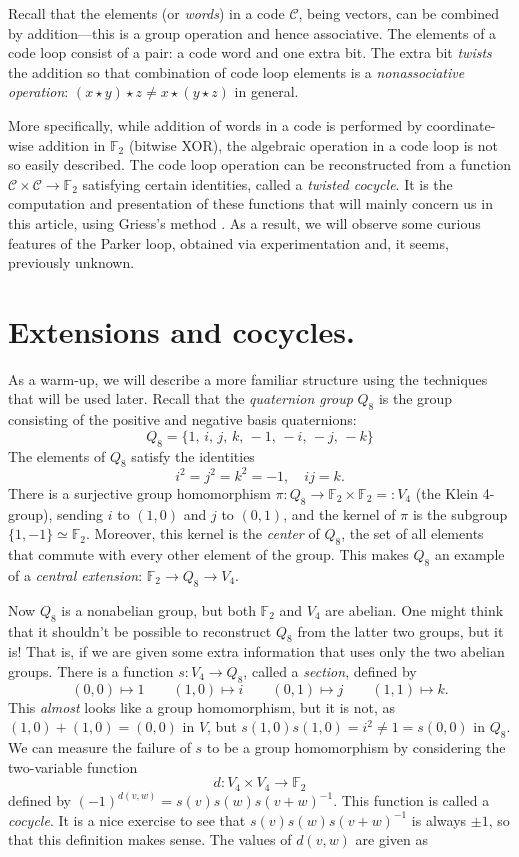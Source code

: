\documentclass{article}
\theoremstyle{plain}
\theoremstyle{definition}
\def \cC {\mathcal{C}}
\def \FF {\mathbb{F}}
\begin{document}
Recall that the elements (or \emph{words}) in a code $\cC$, being vectors, can be combined by addition---this is a group operation and hence associative. 
The elements of a code loop consist of a pair: a code word and one extra bit.
The extra bit \emph{twists} the addition so that combination of code loop elements is a \emph{nonassociative operation}: $(x\star y)\star z\not=x\star (y\star z)$ in general.

More specifically, while addition of words in a code is performed by coordinate-wise addition in $\FF_2$ (bitwise XOR), the algebraic operation in a code loop is not so easily described.
The code loop operation can be reconstructed from a function $\cC \times \cC \to \FF_2$ satisfying certain identities, called a \emph{twisted cocycle}.
It is the computation and presentation of these functions that will mainly concern us in this article, using Griess's method \cite[proof of Theorem 10]{Griess}.
As a result, we will observe some curious features of the Parker loop, obtained via experimentation and, it seems, previously unknown.

\section{Extensions and cocycles.}

As a warm-up, we will describe a more familiar structure using the techniques that will be used later. 
Recall that the \emph{quaternion group} $Q_8$ is the group consisting of the positive and negative basis quaternions:
\[
	Q_8 = \{1,\, i,\, j,\, k,\,-1,\, -i,\, -j,\, -k\}
\]
The elements of $Q_8$ satisfy the identities
\[
	i^2 = j^2 = k^2 = -1, \quad ij=k.
\]
There is a surjective group homomorphism $\pi\colon Q_8 \to \FF_2 \times \FF_2 =: V_4$ (the Klein 4-group), sending $i$ to $(1,0)$ and $j$ to $(0,1)$, and the kernel of $\pi$ is the subgroup $\{1,-1\}\simeq \FF_2$.
Moreover, this kernel is the \emph{center} of $Q_8$, the set of all elements that commute with every other element of the group. This makes $Q_8$ an example of a \emph{central extension}: $\FF_2\to Q_8 \to V_4$.

Now $Q_8$ is a nonabelian group, but both $\FF_2$ and $V_4$ are abelian.
One might think that it shouldn't be possible to reconstruct $Q_8$ from the latter two groups, but it is! 
That is, if we are given some extra information that uses only the two abelian groups.
There is a function $s\colon V_4 \to Q_8$, called a \emph{section}, defined by 
\[
(0,0) \mapsto 1\qquad
(1,0) \mapsto i\qquad
(0,1) \mapsto j\qquad
(1,1) \mapsto k.
\]
This \emph{almost} looks like a group homomorphism, but it is not, as $(1,0) + (1,0) = (0,0)$ in $V$, but $s(1,0)s(1,0) = i^2 \not= 1 = s(0,0)$ in $Q_8$.
We can measure the failure of $s$ to be a group homomorphism by considering the two-variable function
\[
	d\colon V_4 \times V_4 \to \FF_2
\]
defined by $ (-1)^{d(v,w)} = s(v)s(w)s(v+w)^{-1}$. This function is called a \emph{cocycle}.
It is a nice exercise to see that $s(v)s(w)s(v+w)^{-1}$ is always $\pm 1$, so that this definition makes sense. The values of $d(v,w)$ are given as
\end{document}

